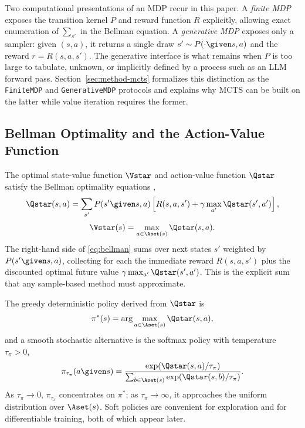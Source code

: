 Two computational presentations of an MDP recur in this paper. A
\emph{finite MDP} exposes the transition kernel $P$ and reward function
$R$ explicitly, allowing exact enumeration of $\sum_{s'}$ in the Bellman
equation. A \emph{generative MDP} exposes only a sampler: given $(s, a)$,
it returns a single draw $s' \sim P(\cdot \given s, a)$ and the reward
$r = R(s, a, s')$. The generative interface is what remains when $P$ is
too large to tabulate, unknown, or implicitly defined by a process such
as an LLM forward pass. Section~\ref{sec:method-mcts} formalizes this
distinction as the \texttt{FiniteMDP} and \texttt{GenerativeMDP}
protocols and explains why MCTS can be built on the latter while value
iteration requires the former.

\subsection{Bellman Optimality and the Action-Value Function}
\label{sec:background-bellman}

The optimal state-value function $\Vstar$ and action-value function
$\Qstar$ satisfy the Bellman optimality equations
\citep{sutton2018reinforcement},
\begin{equation}
\Qstar(s, a)
= \sum_{s'} P(s' \given s, a)
  \left[ R(s, a, s') + \gamma \max_{a'} \Qstar(s', a') \right],
\label{eq:bellman}
\end{equation}
\begin{equation}
\Vstar(s) = \max_{a \in \Aset(s)} \Qstar(s, a).
\label{eq:vstar}
\end{equation}
The right-hand side of \eqref{eq:bellman} sums over next states $s'$
weighted by $P(s' \given s, a)$, collecting for each the immediate reward
$R(s, a, s')$ plus the discounted optimal future value
$\gamma \max_{a'} \Qstar(s', a')$. This is the explicit sum that any
sample-based method must approximate.

The greedy deterministic policy derived from $\Qstar$ is
\begin{equation}
\pi^{\ast}(s) = \arg\max_{a \in \Aset(s)} \Qstar(s, a),
\label{eq:greedy-policy}
\end{equation}
and a smooth stochastic alternative is the softmax policy with temperature
$\tau_{\pi} > 0$,
\begin{equation}
\pi_{\tau_{\pi}}(a \given s)
= \frac{\exp(\Qstar(s, a) / \tau_{\pi})}{\sum_{b \in \Aset(s)} \exp(\Qstar(s, b) / \tau_{\pi})}.
\label{eq:softmax-policy}
\end{equation}
As $\tau_{\pi} \to 0$, $\pi_{\tau_{\pi}}$ concentrates on $\pi^{\ast}$; as
$\tau_{\pi} \to \infty$, it approaches the uniform distribution over
$\Aset(s)$. Soft policies are convenient for exploration and for
differentiable training, both of which appear later.

